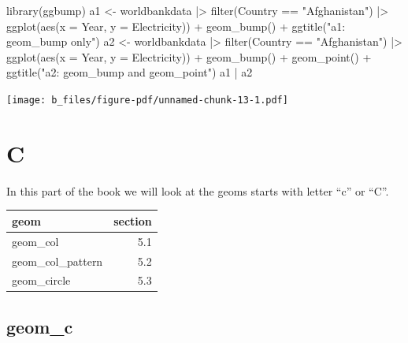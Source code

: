 \documentclass[
  letterpaper,
  DIV=11,
  numbers=noendperiod]{scrreprt}
\newenvironment{Shaded}{\begin{snugshade}}{\end{snugshade}}
\newcommand{\AttributeTok}[1]{\textcolor[rgb]{0.40,0.45,0.13}{#1}}
\newcommand{\FunctionTok}[1]{\textcolor[rgb]{0.28,0.35,0.67}{#1}}
\newcommand{\NormalTok}[1]{\textcolor[rgb]{0.00,0.23,0.31}{#1}}
\newcommand{\OtherTok}[1]{\textcolor[rgb]{0.00,0.23,0.31}{#1}}
\newcommand{\SpecialCharTok}[1]{\textcolor[rgb]{0.37,0.37,0.37}{#1}}
\newcommand{\StringTok}[1]{\textcolor[rgb]{0.13,0.47,0.30}{#1}}
\begin{document}
\begin{Shaded}
\begin{Highlighting}[]
\FunctionTok{library}\NormalTok{(ggbump)}
\NormalTok{a1 }\OtherTok{\textless{}{-}}\NormalTok{ worldbankdata }\SpecialCharTok{|\textgreater{}}
  \FunctionTok{filter}\NormalTok{(Country }\SpecialCharTok{==} \StringTok{"Afghanistan"}\NormalTok{) }\SpecialCharTok{|\textgreater{}}
  \FunctionTok{ggplot}\NormalTok{(}\FunctionTok{aes}\NormalTok{(}\AttributeTok{x =}\NormalTok{ Year, }\AttributeTok{y =}\NormalTok{ Electricity)) }\SpecialCharTok{+}
  \FunctionTok{geom\_bump}\NormalTok{() }\SpecialCharTok{+}
  \FunctionTok{ggtitle}\NormalTok{(}\StringTok{"a1: geom\_bump only"}\NormalTok{)}
\NormalTok{a2 }\OtherTok{\textless{}{-}}\NormalTok{ worldbankdata }\SpecialCharTok{|\textgreater{}}
  \FunctionTok{filter}\NormalTok{(Country }\SpecialCharTok{==} \StringTok{"Afghanistan"}\NormalTok{) }\SpecialCharTok{|\textgreater{}}
  \FunctionTok{ggplot}\NormalTok{(}\FunctionTok{aes}\NormalTok{(}\AttributeTok{x =}\NormalTok{ Year, }\AttributeTok{y =}\NormalTok{ Electricity)) }\SpecialCharTok{+}
  \FunctionTok{geom\_bump}\NormalTok{() }\SpecialCharTok{+}
  \FunctionTok{geom\_point}\NormalTok{() }\SpecialCharTok{+}
  \FunctionTok{ggtitle}\NormalTok{(}\StringTok{"a2: geom\_bump and geom\_point"}\NormalTok{)}
\NormalTok{a1 }\SpecialCharTok{|}\NormalTok{ a2}
\end{Highlighting}
\end{Shaded}

\texttt{[image: b\_files/figure-pdf/unnamed-chunk-13-1.pdf]}

\part{C}

In this part of the book we will look at the geoms starts with letter
``c'' or ``C''.

\begin{longtable}[]{@{}lr@{}}
\toprule\noalign{}
geom & section \\
\midrule\noalign{}
\endhead
\bottomrule\noalign{}
\endlastfoot
geom\_col & 5.1 \\
geom\_col\_pattern & 5.2 \\
geom\_circle & 5.3 \\
\end{longtable}

\chapter{geom\_c}\label{sec-c}
\end{document}
